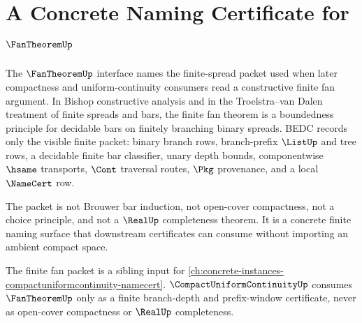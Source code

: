 \chapter{A Concrete Naming Certificate for $\FanTheoremUp$}
\label{ch:concrete-instances-fantheorem-namecert}

The $\FanTheoremUp$ interface names the finite-spread packet used when later compactness and uniform-continuity consumers read a constructive finite fan argument. In Bishop constructive analysis and in the Troelstra--van Dalen treatment of finite spreads and bars, the finite fan theorem is a boundedness principle for decidable bars on finitely branching binary spreads. BEDC records only the visible finite packet: binary branch rows, branch-prefix $\ListUp$ and tree rows, a decidable finite bar classifier, unary depth bounds, componentwise $\hsame$ transports, $\Cont$ traversal routes, $\Pkg$ provenance, and a local $\NameCert$ row.

The packet is not Brouwer bar induction, not open-cover compactness, not a choice principle, and not a $\RealUp$ completeness theorem. It is a concrete finite naming surface that downstream certificates can consume without importing an ambient compact space.

The finite fan packet is a sibling input for \autoref{ch:concrete-instances-compactuniformcontinuity-namecert}. $\CompactUniformContinuityUp$ consumes $\FanTheoremUp$ only as a finite branch-depth and prefix-window certificate, never as open-cover compactness or $\RealUp$ completeness.

